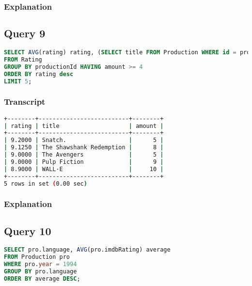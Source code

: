 \subsubsection{Explanation}


\subsection{Query 9}
\begin{lstlisting}[language=sql]
SELECT AVG(rating) rating, (SELECT title FROM Production WHERE id = productionId) title, COUNT(*) amount
FROM Rating
GROUP BY productionId HAVING amount >= 4
ORDER BY rating desc
LIMIT 5;
\end{lstlisting}

\subsubsection{Transcript}
\begin{lstlisting}[language=bash]
+--------+--------------------------+--------+
| rating | title                    | amount |
+--------+--------------------------+--------+
| 9.2000 | Snatch.                  |      5 |
| 9.1250 | The Shawshank Redemption |      8 |
| 9.0000 | The Avengers             |      5 |
| 9.0000 | Pulp Fiction             |      9 |
| 8.9000 | WALL·E                   |     10 |
+--------+--------------------------+--------+
5 rows in set (0.00 sec)
\end{lstlisting}

\subsubsection{Explanation}


\subsection{Query 10}
\begin{lstlisting}[language=sql]
SELECT pro.language, AVG(pro.imdbRating) average
FROM Production pro
WHERE pro.year = 1994
GROUP BY pro.language
ORDER BY average DESC;
\end{lstlisting}

